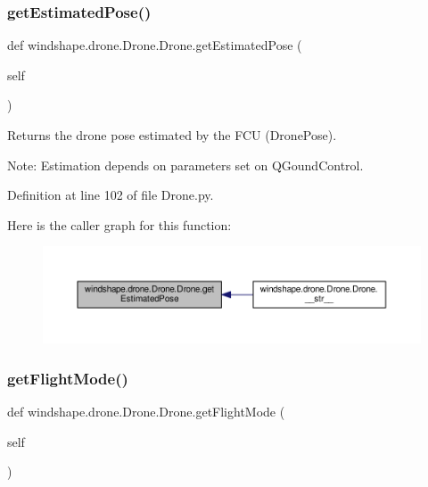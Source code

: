 \subsubsection{\texorpdfstring{get\+Estimated\+Pose()}{getEstimatedPose()}}
{\footnotesize\ttfamily def windshape.\+drone.\+Drone.\+Drone.\+get\+Estimated\+Pose (\begin{DoxyParamCaption}\item[{}]{self }\end{DoxyParamCaption})}

\begin{DoxyVerb}Returns the drone pose estimated by the FCU (DronePose).

Note:
    Estimation depends on parameters set on QGoundControl.
\end{DoxyVerb}
 

Definition at line 102 of file Drone.\+py.

Here is the caller graph for this function\+:\nopagebreak
\begin{figure}[H]
\begin{center}
\leavevmode
\includegraphics[width=350pt]{classwindshape_1_1drone_1_1_drone_1_1_drone_ab4435f13cb1e062137c822f7b0be778a_icgraph}
\end{center}
\end{figure}
\mbox{\label{classwindshape_1_1drone_1_1_drone_1_1_drone_a05934a953a52558fd19b18435c52cc40}} 
\subsubsection{\texorpdfstring{get\+Flight\+Mode()}{getFlightMode()}}
{\footnotesize\ttfamily def windshape.\+drone.\+Drone.\+Drone.\+get\+Flight\+Mode (\begin{DoxyParamCaption}\item[{}]{self }\end{DoxyParamCaption})}

